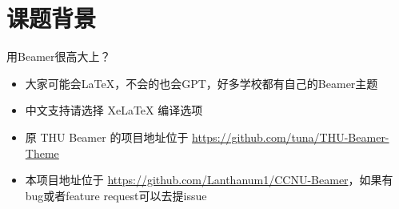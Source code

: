 \section{课题背景}

\begin{frame}{用Beamer很高大上？}
	\begin{itemize}[<+-| alert@+>] %
		\item 大家可能会\LaTeX{}，不会的也会GPT，好多学校都有自己的Beamer主题
		\item 中文支持请选择 Xe\LaTeX{} 编译选项
		\item 原 THU Beamer 的项目地址位于 \url{https://github.com/tuna/THU-Beamer-Theme}
		\item 本项目地址位于 \url{https://github.com/Lanthanum1/CCNU-Beamer}，如果有bug或者feature request可以去提issue
	\end{itemize}
\end{frame}
